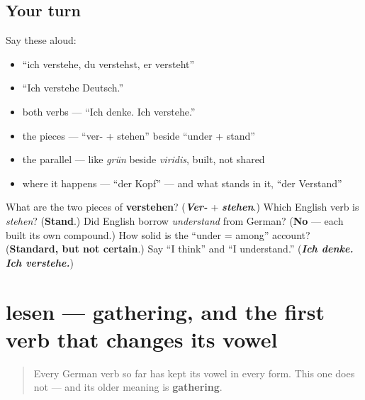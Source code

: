 \subsection*{Your turn}
Say these aloud:

\begin{itemize}
\raggedright
  \item \textquotedblleft{}ich verstehe, du verstehst, er versteht\textquotedblright{}
  \item \textquotedblleft{}Ich verstehe Deutsch.\textquotedblright{}
  \item both verbs — \textquotedblleft{}Ich denke. Ich verstehe.\textquotedblright{}
  \item the pieces — \textquotedblleft{}ver- + stehen\textquotedblright{} beside \textquotedblleft{}under + stand\textquotedblright{}
  \item the parallel — like \emph{grün} beside \emph{viridis}, built, not shared
  \item where it happens — \textquotedblleft{}der Kopf\textquotedblright{} — and what stands in it, \textquotedblleft{}der Verstand\textquotedblright{}
\end{itemize}

\begin{tcolorbox}[breakable,colback=teal!4,colframe=teal!35!black,title={Before you move on}]
What are the two pieces of \textbf{verstehen}? (\emph{\textbf{Ver-}} + \emph{\textbf{stehen}}.) Which English verb is \emph{stehen}? (\textbf{Stand}.) Did English borrow \emph{understand} from German? (\textbf{No} — each built its own compound.) How solid is the \textquotedblleft{}under = among\textquotedblright{} account? (\textbf{Standard, but not certain}.) Say \textquotedblleft{}I think\textquotedblright{} and \textquotedblleft{}I understand.\textquotedblright{} (\emph{\textbf{Ich denke. Ich verstehe.}})
\end{tcolorbox}
\section[lesen]{lesen — gathering, and the first verb that changes its vowel}

\label{lesson:GE-C24-lesen}



\begin{quote}
Every German verb so far has kept its vowel in every form. This one does not — and its older meaning is \textbf{gathering}.
\end{quote}

